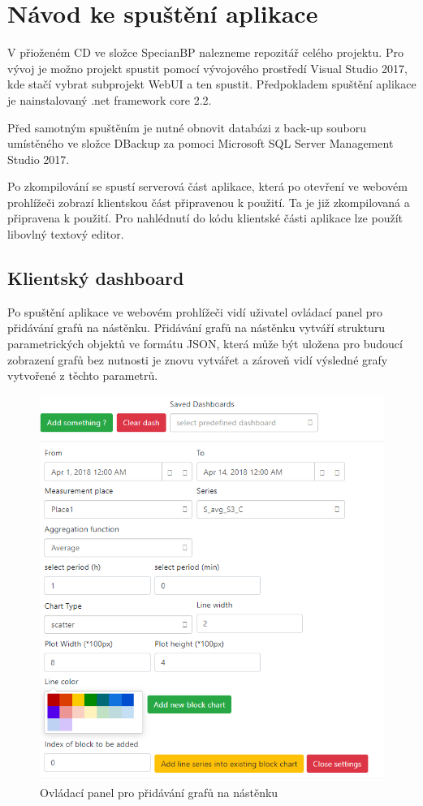 \documentclass[FM,BP]{tulthesis}
\begin{document}
\chapter{Návod ke spuštění aplikace}
    V přioženém CD ve složce SpecianBP nalezneme repozitář celého projektu. 
    Pro vývoj je možno projekt spustit pomocí vývojového prostředí Visual Studio 2017, kde stačí vybrat subprojekt WebUI a ten spustit. 
    Předpokladem spuštění aplikace je nainstalovaný .net framework core 2.2. 

    Před samotným spuštěním je nutné obnovit databázi z back-up souboru umístěného ve složce DBackup za pomoci Microsoft SQL Server Management Studio 2017.

    Po zkompilování se spustí serverová část aplikace, která po otevření ve webovém prohlížeči zobrazí klientskou část připravenou k použití. 
    Ta je již zkompilovaná a připravena k použití. Pro nahlédnutí do kódu klientské části aplikace lze použít libovlný textový editor.

    \section{Klientský dashboard}
        Po spuštění aplikace ve webovém prohlížeči vidí uživatel ovládací panel pro  přidávání grafů na nástěnku. 
        Přidávání grafů na nástěnku vytváří strukturu parametrických objektů ve formátu JSON, 
        která může být uložena pro budoucí zobrazení grafů bez nutnosti je znovu vytvářet a zároveň vidí výsledné grafy vytvořené z těchto parametrů.

        \begin{figure}[h]
            \centering
            \includegraphics[scale=0.80]{pic/controlPanel.PNG}
            \caption{Ovládací panel pro přidávání grafů na nástěnku} \label{Obrázek č. 2}
        \end{figure}
\end{document}
